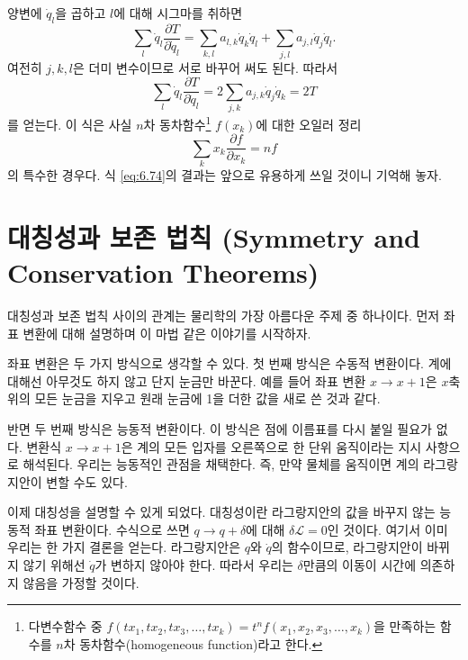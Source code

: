 \documentclass[chapter, oneside, b5paper]{oblivoir}
\theoremstyle{plain}
\theoremstyle{definition}
\theoremstyle{remark}
\begin{document}
양변에 $\dot{q}_l$을 곱하고 $l$에 대해 시그마를 취하면
\begin{equation}
    \sum_l \dot{q}_l \frac{\partial T}{\partial \dot{q}_l} = \sum_{k, l} a_{l, k} \dot{q}_k \dot{q}_l + \sum_{j, l} a_{j, l} \dot{q}_j \dot{q}_l.
\end{equation}
여전히 $j, k, l$은 더미 변수이므로 서로 바꾸어 써도 된다. 따라서
\begin{equation}
    \sum_l \dot{q}_l \frac{\partial T}{\partial \dot{q}_l} = 2 \sum_{j, k} a_{j, k} \dot{q}_j \dot{q}_k = 2T \label{eq:6.74}
\end{equation}
를 얻는다. 이 식은 사실 $n$차 동차함수\footnote{다변수함수 중 $f(tx_1, tx_2, tx_3, \dots , tx_k) = t^n f(x_1, x_2, x_3, \dots, x_k)$을 만족하는 함수를 $n$차 동차함수(homogeneous function)라고 한다.} $f(x_k)$에 대한 오일러 정리
\begin{equation}
    \sum_k x_k \frac{\partial f}{\partial x_k} =nf
\end{equation}
의 특수한 경우다. 식 \ref{eq:6.74}의 결과는 앞으로 유용하게 쓰일 것이니 기억해 놓자.

\section{대칭성과 보존 법칙 (Symmetry and Conservation Theorems)}
대칭성과 보존 법칙 사이의 관계는 물리학의 가장 아름다운 주제 중 하나이다. 먼저 좌표 변환에 대해 설명하며 이 마법 같은 이야기를 시작하자.

좌표 변환은 두 가지 방식으로 생각할 수 있다. 첫 번째 방식은 수동적 변환이다. 계에 대해선 아무것도 하지 않고 단지 눈금만 바꾼다. 예를 들어 좌표 변환 $x \to x+1$은 $x$축 위의 모든 눈금을 지우고 원래 눈금에 1을 더한 값을 새로 쓴 것과 같다.

반면 두 번째 방식은 능동적 변환이다. 이 방식은 점에 이름표를 다시 붙일 필요가 없다. 변환식 $x \to x+1$은 계의 모든 입자를 오른쪽으로 한 단위 움직이라는 지시 사항으로 해석된다. 우리는 능동적인 관점을 채택한다. 즉, 만약 물체를 움직이면 계의 라그랑지안이 변할 수도 있다.

이제 대칭성을 설명할 수 있게 되었다. 대칭성이란 라그랑지안의 값을 바꾸지 않는 능동적 좌표 변환이다. 수식으로 쓰면 $q \to q+\delta$에 대해 $\delta \mathcal{L} =0$인 것이다. 여기서 이미 우리는 한 가지 결론을 얻는다. 라그랑지안은 $q$와 $\dot{q}$의 함수이므로, 라그랑지안이 바뀌지 않기 위해선 $\dot{q}$가 변하지 않아야 한다. 따라서 우리는 $\delta$만큼의 이동이 시간에 의존하지 않음을 가정할 것이다.
\end{document}
